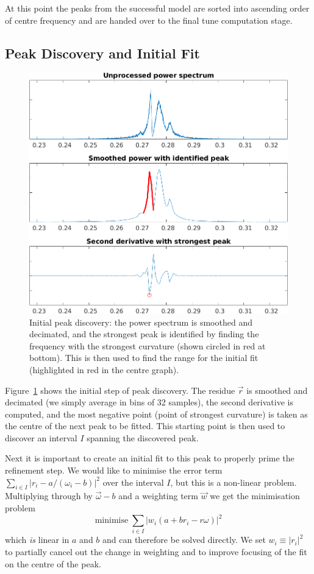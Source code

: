 \documentclass[
    a4paper,
    keeplastbox,            %
    hyphens,                %
    nospread,               %
    refpage,                %
]{jacow}
\newcommand{\squarecaption}[2][1]{\caption[#1]{#2\unskip\parfillskip 0pt}}
\begin{document}
At this point the peaks from the successful model are sorted into ascending
order of centre frequency and are handed over to the final tune computation
stage.


\subsection{Peak Discovery and Initial Fit}

\begin{figure}[b]
\includegraphics[width=\linewidth]{WECO03f2.png}
\squarecaption{%
Initial peak discovery: the power spectrum is smoothed and decimated, and the
strongest peak is identified by finding the frequency with the strongest
curvature (shown circled in red at bottom).  This is then used to find
the range for the initial fit (highlighted in red in the centre graph).
}
\label{fig:find-peak}
\end{figure}

Figure~\ref{fig:find-peak} shows the initial step of peak discovery.
The residue $\vec{r}$ is smoothed and decimated (we simply average in bins of 32
samples), the second derivative is computed, and the most negative point (point
of strongest curvature) is taken as the centre of the next peak to be fitted.
This starting point is then used to discover an interval $I$ spanning the
discovered peak.

Next it is important to create an initial fit to this peak to properly prime the
refinement step.  We would like to minimise the error term
$\sum_{i\in I}|r_i-a/(\omega_i-b)|^2$ over the interval $I$, but this is a
non-linear problem.  Multiplying through by $\vec\omega-b$ and a weighting term
$\vec w$ we get the minimisation problem
\[
    \text{minimise}\;\sum_{i\in I} |w_i (a + b r_i - r \omega)|^2
\]
which \emph{is} linear in $a$ and $b$ and can therefore be solved directly.  We
set $w_i\equiv|r_i|^2$ to partially cancel out the change in weighting and to
improve focusing of the fit on the centre of the peak.
\end{document}
